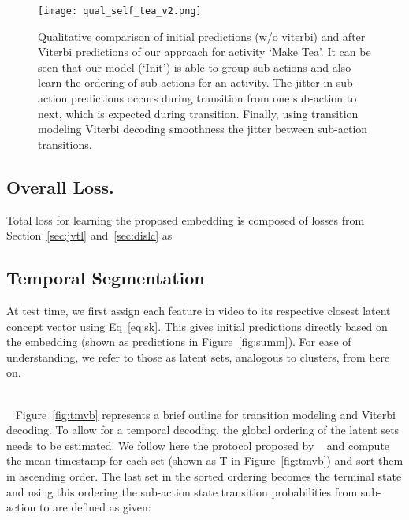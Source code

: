 \documentclass[final]{cvpr}
\begin{document}
\begin{figure}[t]
\texttt{[image: qual\_self\_tea\_v2.png]}
\caption{{\small Qualitative comparison of initial predictions (w/o viterbi) and after Viterbi predictions of our approach for activity `Make Tea'. It can be seen that our model (`Init') is able to group sub-actions and also learn the ordering of sub-actions for an activity. The jitter in sub-action predictions occurs during transition from one sub-action to next, which is expected during transition. Finally, using transition modeling Viterbi decoding smoothness the jitter between sub-action transitions. 
}}
\vspace{-0.2cm}
\label{fig:qual_detail}
\end{figure}

\subsection{Overall Loss.} Total loss for learning the proposed embedding is composed of losses from Section~\ref{sec:jvtl} and~\ref{sec:dislc} as 

\subsection{Temporal Segmentation}

\label{sec:ip} 
At test time, we first assign each feature in video to its respective closest latent concept vector using Eq~\ref{eq:sk}. This gives initial predictions directly based on the embedding (shown as predictions in Figure~\ref{fig:summ}). For ease of understanding, we refer to those as latent sets, analogous to clusters, from here on.



\\
~\label{sec:tmvb}
\noindent Figure~\ref{fig:tmvb} represents a brief outline for transition modeling and Viterbi decoding. To allow for a temporal decoding, the global ordering of the latent sets needs to be estimated. We follow here the protocol proposed by ~\cite{kukleva2019unsupervised} and compute the mean timestamp for each set (shown as T in Figure~\ref{fig:tmvb}) and sort them in ascending order. 
The last set in the sorted ordering becomes the terminal state and using this ordering the sub-action state transition probabilities  from sub-action  to  are defined as  given:
\vspace{-0.3cm}
\end{document}
